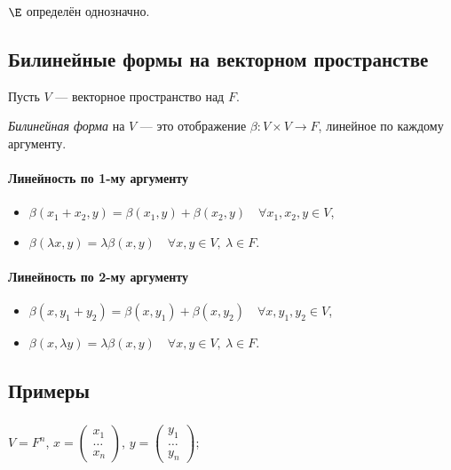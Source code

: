\begin{exercise}
    $\E$ определён однозначно.
\end{exercise}


\subsection{Билинейные формы на векторном пространстве}

Пусть $V$ --- векторное пространство над $F$.

\begin{definition}
    \textit{Билинейная форма} на $V$ --- это отображение $\beta \colon V \times V \to F$, линейное по каждому аргументу.
\end{definition}

\paragraph{Линейность по 1-му аргументу}
\begin{itemize}[nosep]
\item $\beta(x_1 + x_2, y) = \beta(x_1, y) + \beta(x_2, y) \quad \forall x_1, x_2, y \in V$,
\item $\beta(\lambda x, y) = \lambda\beta(x, y) \quad \forall x, y \in V, \ \lambda \in F$.
\end{itemize}

\paragraph{Линейность по 2-му аргументу}
\begin{itemize}[nosep]
\item $\beta(x, y_1 + y_2) = \beta(x, y_1) + \beta(x, y_2) \quad \forall x, y_1, y_2 \in V$,
\item $\beta(x, \lambda y) = \lambda\beta(x, y) \quad \forall x, y \in V, \ \lambda \in F$.
\end{itemize}


\subsection{Примеры}
\label{lec19:bilinear_examples}

\subsubsection{}

$V = F^n$, $x = \begin{pmatrix} x_1 \\ \dots \\ x_n \end{pmatrix}$, $y = \begin{pmatrix} y_1 \\ \dots \\ y_n \end{pmatrix}$;

